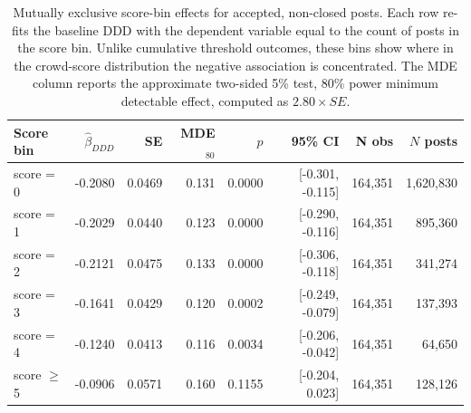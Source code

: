 \begin{table}[ht]
\centering
\caption{Mutually exclusive score-bin effects for accepted, non-closed posts. Each row re-fits the baseline DDD with the dependent variable equal to the count of posts in the score bin. Unlike cumulative threshold outcomes, these bins show where in the crowd-score distribution the negative association is concentrated. The MDE column reports the approximate two-sided 5\% test, 80\% power minimum detectable effect, computed as $2.80\times SE$.}
\label{tab:score_bin_artefact_effects}
\small
\begin{tabular}{lrrrrrrr}
\toprule
Score bin & $\hat\beta_{DDD}$ & SE & MDE$_{80}$ & $p$ & 95\% CI & N obs & $N$ posts \\
\midrule
score = 0 & -0.2080 & 0.0469 & 0.131 & 0.0000 & [-0.301, -0.115] & 164,351 & 1,620,830 \\
score = 1 & -0.2029 & 0.0440 & 0.123 & 0.0000 & [-0.290, -0.116] & 164,351 & 895,360 \\
score = 2 & -0.2121 & 0.0475 & 0.133 & 0.0000 & [-0.306, -0.118] & 164,351 & 341,274 \\
score = 3 & -0.1641 & 0.0429 & 0.120 & 0.0002 & [-0.249, -0.079] & 164,351 & 137,393 \\
score = 4 & -0.1240 & 0.0413 & 0.116 & 0.0034 & [-0.206, -0.042] & 164,351 & 64,650 \\
score $\geq$ 5 & -0.0906 & 0.0571 & 0.160 & 0.1155 & [-0.204, 0.023] & 164,351 & 128,126 \\
\bottomrule
\end{tabular}
\end{table}
